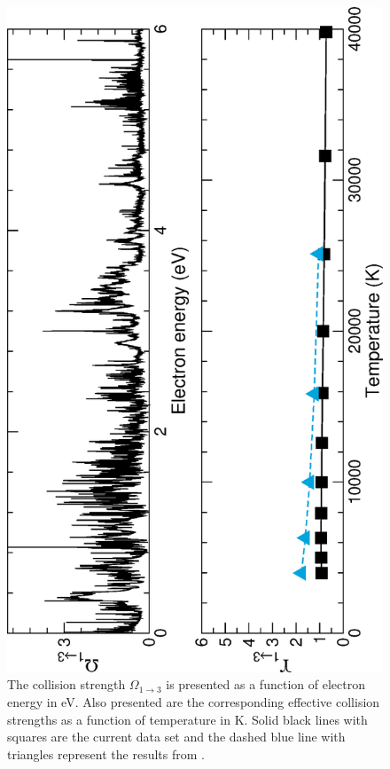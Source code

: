 %
\begin{figure}
\centering
\includegraphics[scale=0.75, angle=-90]{Figures/Cobalt/electron/trans2.eps}
\caption{The collision strength $\Omega_{1\rightarrow 3}$ is presented as a function of electron energy in eV. Also presented are the corresponding effective collision strengths as a function of temperature in K. Solid black lines with squares are the current data set and the dashed blue line with triangles represent the results from \citet{2016MNRAS.tmp..556S}. \label{fig:co_coll_infra2}}
\end{figure}
%

